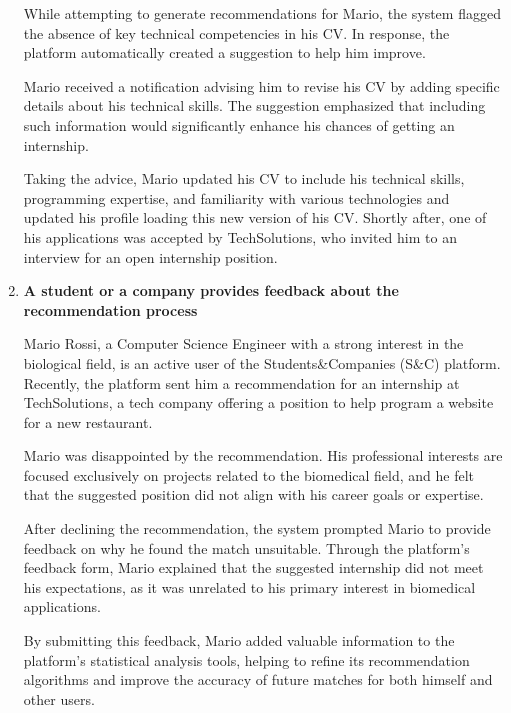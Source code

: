 \begin{enumerate}
    While attempting to generate recommendations for Mario, the system flagged the absence of key technical competencies in his CV. In response, the platform automatically created a suggestion to help him improve.

    Mario received a notification advising him to revise his CV by adding specific details about his technical skills. The suggestion emphasized that including such information would significantly enhance his chances of getting an internship.

    Taking the advice, Mario updated his CV to include his technical skills, programming expertise, and familiarity with various technologies and updated his profile loading this new version of his CV. Shortly after, one of his applications was accepted by TechSolutions, who invited him to an interview for an open internship position.

    \item \textbf{A student or a company provides feedback about the recommendation process}

    Mario Rossi, a Computer Science Engineer with a strong interest in the biological field, is an active user of the Students\&Companies (S\&C) platform. Recently, the platform sent him a recommendation for an internship at TechSolutions, a tech company offering a position to help program a website for a new restaurant.

    Mario was disappointed by the recommendation. His professional interests are focused exclusively on projects related to the biomedical field, and he felt that the suggested position did not align with his career goals or expertise.

    After declining the recommendation, the system prompted Mario to provide feedback on why he found the match unsuitable. Through the platform's feedback form, Mario explained that the suggested internship did not meet his expectations, as it was unrelated to his primary interest in biomedical applications.

    By submitting this feedback, Mario added valuable information to the platform’s statistical analysis tools, helping to refine its recommendation algorithms and improve the accuracy of future matches for both himself and other users.
      
\end{enumerate}

\pagebreak
